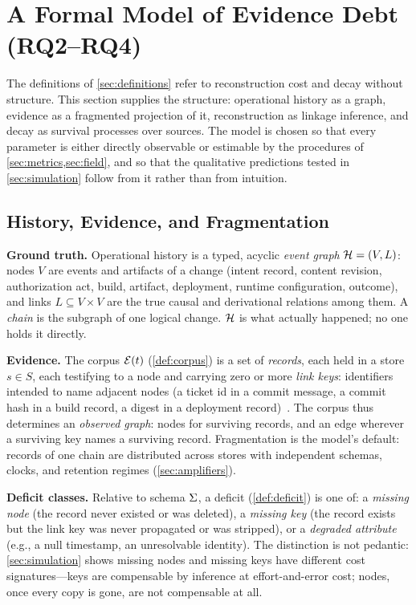 \section{A Formal Model of Evidence Debt (RQ2--RQ4)}
\label{sec:model}

The definitions of \cref{sec:definitions} refer to reconstruction cost and decay
without structure. This section supplies the structure: operational history as a
graph, evidence as a fragmented projection of it, reconstruction as linkage
inference, and decay as survival processes over sources. The model is chosen so that
every parameter is either directly observable or estimable by the procedures of
\cref{sec:metrics,sec:field}, and so that the qualitative predictions tested in
\cref{sec:simulation} follow from it rather than from intuition.

\subsection{History, Evidence, and Fragmentation}
\label{sec:model-graph}

\textbf{Ground truth.} Operational history is a typed, acyclic \emph{event graph}
$\mathcal{H} = (V, L)$: nodes $V$ are events and artifacts of a change (intent record,
content revision, authorization act, build, artifact, deployment, runtime
configuration, outcome), and links $L \subseteq V \times V$ are the true causal and
derivational relations among them. A \emph{chain} is the subgraph of one logical
change. $\mathcal{H}$ is what actually happened; no one holds it directly.

\textbf{Evidence.} The corpus $\mathcal{E}(t)$ (\cref{def:corpus}) is a set of
\emph{records}, each held in a store $s \in S$, each testifying to a node and
carrying zero or more \emph{link keys}: identifiers intended to name adjacent nodes
(a ticket id in a commit message, a commit hash in a build record, a digest in a
deployment record)~\cite{sigelman2010}. The corpus thus determines an
\emph{observed graph}: nodes for surviving records, and an edge wherever a surviving
key names a surviving record. Fragmentation is the model's default: records of one
chain are distributed across stores with independent schemas, clocks, and retention
regimes (\cref{sec:amplifiers}).

\textbf{Deficit classes.} Relative to schema $\Sigma$, a deficit
(\cref{def:deficit}) is one of: a \emph{missing node} (the record never existed or
was deleted), a \emph{missing key} (the record exists but the link key was never
propagated or was stripped), or a \emph{degraded attribute} (e.g., a null timestamp,
an unresolvable identity). The distinction is not pedantic: \cref{sec:simulation}
shows missing nodes and missing keys have different cost signatures---keys are
compensable by inference at effort-and-error cost; nodes, once every copy is gone,
are not compensable at all.

